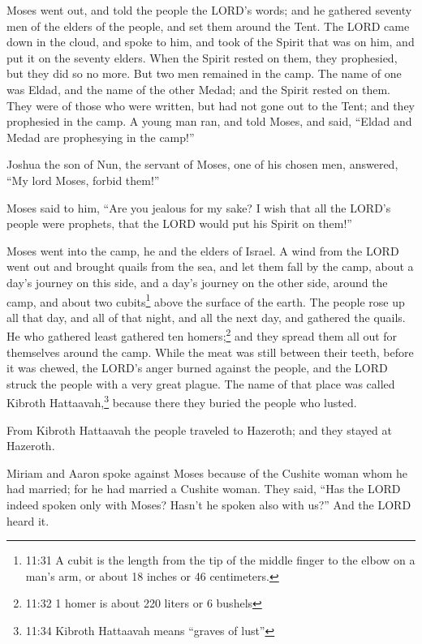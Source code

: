 \myverse{}Moses went out, and told the people the LORD’s words; and he
gathered seventy men of the elders of the people, and set them around the Tent.
\myverse{}The LORD came down in the cloud, and spoke to him, and took of the Spirit
that was on him, and put it on the seventy elders. When the Spirit rested on them, they prophesied, but
they did so no more.
\myverse{}But two men remained in the camp. The name of one was Eldad, and the name
of the other Medad; and the Spirit rested on them. They were of those who were written, but had not gone
out to the Tent; and they prophesied in the camp.
\myverse{}A young man ran, and told Moses, and said, “Eldad and Medad are prophesying
in the camp!”


\myverse{}Joshua the son of Nun, the servant of Moses, one of his chosen
men, answered, “My lord Moses, forbid them!”


\myverse{}Moses said to him, “Are you jealous for my sake? I wish that
all the LORD’s people were prophets, that the LORD would put his Spirit on them!”


\myverse{}Moses went into the camp, he and the elders of Israel.
\myverse{}A wind from the LORD went out and brought quails from the sea, and let them
fall by the camp, about a day’s journey on this side, and a day’s journey on the other side, around the
camp, and about two cubits\footnote{ 11:31 A cubit is the length from the tip of the middle finger to the elbow on a man’s arm, or about
	18 inches or 46 centimeters.} above the surface of the earth.
\myverse{}The people rose up all that day, and all of that night, and all the next
day, and gathered the quails. He who gathered least gathered ten homers;\footnote{ 11:32 1 homer is about 220 liters or 6 bushels} and they spread them all out for themselves
around the camp.
\myverse{}While the meat was still between their teeth, before it was chewed, the LORD’s
anger burned against the people, and the LORD struck the people with a very great plague.
\myverse{}The name of that place was called Kibroth Hattaavah,\footnote{ 11:34 Kibroth Hattaavah means “graves of lust”} because there they buried the people who lusted.


\myverse{}From Kibroth Hattaavah the people traveled to Hazeroth; and
they stayed at Hazeroth.


\mychapter{} \myverse*{}Miriam and Aaron spoke against Moses because of the Cushite woman
whom he had married; for he had married a Cushite woman.
\myverse{}They said, “Has the LORD indeed spoken only with Moses? Hasn’t he spoken also
with us?” And the LORD heard it.


